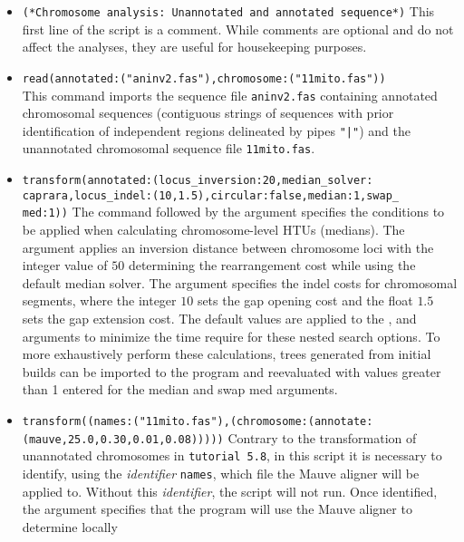 \begin{itemize} 
\item \texttt{(*Chromosome analysis: Unannotated
and annotated sequence*)} This first line of the script is a comment.
While comments are optional and do not affect the analyses, they
are useful for housekeeping purposes.  
\item \texttt{read(annotated:("aninv2.fas"),chromosome:("11mito.fas"))}\\
This command imports the sequence file \texttt{aninv2.fas}
containing annotated chromosomal sequences (contiguous strings of
sequences with prior identification of independent regions delineated
by pipes \texttt{"|"}) and the unannotated chromosomal sequence
file \texttt{11mito.fas}.  
\item \texttt{transform(annotated:(locus\_inversion:20,median\_solver:\\
caprara,locus\_indel:(10,1.5),circular:false,median:1,swap\_\\
med:1))} The  command followed by the argument
 specifies the conditions to be applied when
calculating chromosome-level HTUs (medians). The argument
 applies an inversion distance between
chromosome loci with the integer value of $50$ determining the
rearrangement cost while using the default 
median solver. The argument  specifies
the indel costs for chromosomal segments, where the integer $10$
sets the gap opening cost and the float $1.5$ sets the gap extension
cost. The default values are applied to the ,
 and  arguments to
minimize the time require for these nested search options. To more
exhaustively perform these calculations, trees generated from initial
builds can be imported to the program and reevaluated with values
greater than 1 entered for the median and swap med arguments.  
\item \texttt{transform((names:("11mito.fas"),(chromosome:(annotate:\\
(mauve,25.0,0.30,0.01,0.08)))))}
Contrary to the transformation of unannotated chromosomes in
\texttt{tutorial 5.8}, in this script it is necessary to identify,
using the \emph{identifier} \texttt{names}, which file the Mauve
aligner will be applied to. Without this \emph{identifier}, the
script will not run. Once identified, the argument
 specifies that the program will use
the Mauve aligner \cite{darlingetal2004} to determine locally

\end{itemize}
